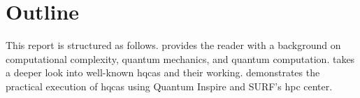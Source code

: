\section{Outline}
This report is structured as follows.
 provides the reader with a background on computational complexity, quantum mechanics, and quantum computation.
 takes a deeper look into well-known \glspl{hqca} and their working.
 demonstrates the practical execution of \glspl{hqca} using Quantum Inspire and SURF's \gls{hpc} center.
